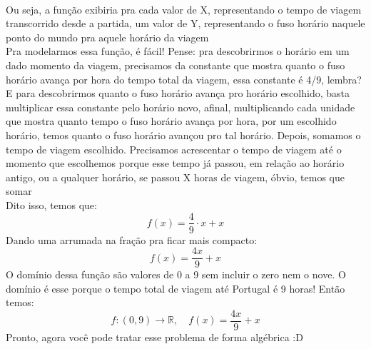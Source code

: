 \documentclass{article}
\begin{document}
\begin{itemize}
    \\[5pt]
    Ou seja, a função exibiria pra cada valor de X, representando o tempo de viagem transcorrido desde a partida, um valor de Y, representando o fuso horário naquele ponto do mundo pra aquele horário da viagem
    \\[5pt]
    Pra modelarmos essa função, é fácil! Pense: pra descobrirmos o horário em um dado momento da viagem, precisamos da constante que mostra quanto o fuso horário avança por hora do tempo total da viagem, essa constante é 4/9, lembra? E para descobrirmos quanto o fuso horário avança pro horário escolhido, basta multiplicar essa constante pelo horário novo, afinal, multiplicando cada unidade que mostra quanto tempo o fuso horário avança por hora, por um escolhido horário, temos quanto o fuso horário avançou pro tal horário. Depois, somamos o tempo de viagem escolhido. Precisamos acrescentar o tempo de viagem até o momento que escolhemos porque esse tempo já passou, em relação ao horário antigo, ou a qualquer horário, se passou X horas de viagem, óbvio, temos que somar
    \\[5pt]
    Dito isso, temos que:
    \[
    f(x)=\frac{4}{9} \cdot x+x
    \]
    Dando uma arrumada na fração pra ficar mais compacto: \[f(x)=\frac{4x}{9}+x\]
    O domínio dessa função são valores de 0 a 9 sem incluir o zero nem o nove. O domínio é esse porque o tempo total de viagem até Portugal é 9 horas! Então temos:
    \[
    f:(0,9)\to\mathbb{R},\quad f(x)=\frac{4x}{9}+x
    \]
    Pronto, agora você pode tratar esse problema de forma algébrica :D


\end{itemize}
\end{document}
